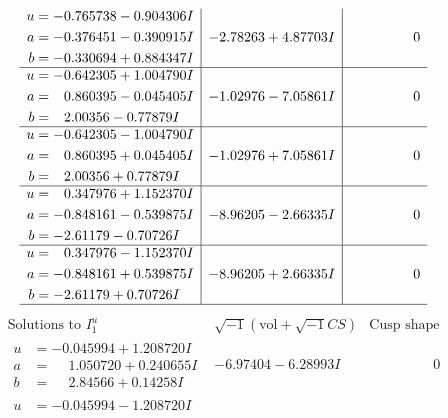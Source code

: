 \documentclass[1p]{elsarticle_modified}
\theoremstyle{definition}
\newcommand{\I}{\sqrt{-1}}
\begin{document}
$$\begin{array}{c|c|c}
\begin{aligned}
u &= -0.765738 - 0.904306 I \\
a &= -0.376451 - 0.390915 I \\
b &= -0.330694 + 0.884347 I\end{aligned}
 & -2.78263 + 4.87703 I & \phantom{-0.000000 } 0 \\ \hline\begin{aligned}
u &= -0.642305 + 1.004790 I \\
a &= \phantom{-}0.860395 - 0.045405 I \\
b &= \phantom{-}2.00356 - 0.77879 I\end{aligned}
 & -1.02976 - 7.05861 I & \phantom{-0.000000 } 0 \\ \hline\begin{aligned}
u &= -0.642305 - 1.004790 I \\
a &= \phantom{-}0.860395 + 0.045405 I \\
b &= \phantom{-}2.00356 + 0.77879 I\end{aligned}
 & -1.02976 + 7.05861 I & \phantom{-0.000000 } 0 \\ \hline\begin{aligned}
u &= \phantom{-}0.347976 + 1.152370 I \\
a &= -0.848161 - 0.539875 I \\
b &= -2.61179 - 0.70726 I\end{aligned}
 & -8.96205 - 2.66335 I & \phantom{-0.000000 } 0 \\ \hline\begin{aligned}
u &= \phantom{-}0.347976 - 1.152370 I \\
a &= -0.848161 + 0.539875 I \\
b &= -2.61179 + 0.70726 I\end{aligned}
 & -8.96205 + 2.66335 I & \phantom{-0.000000 } 0\\
 \hline 
 \end{array}$$\newpage$$\begin{array}{c|c|c}  
\text{Solutions to }I^u_{1}& \I (\text{vol} + \sqrt{-1}CS) & \text{Cusp shape}\\
 \hline 
\begin{aligned}
u &= -0.045994 + 1.208720 I \\
a &= \phantom{-}1.050720 + 0.240655 I \\
b &= \phantom{-}2.84566 + 0.14258 I\end{aligned}
 & -6.97404 - 6.28993 I & \phantom{-0.000000 } 0 \\ \hline\begin{aligned}
u &= -0.045994 - 1.208720 I \\

\end{aligned}
\end{array}$$
\end{document}
